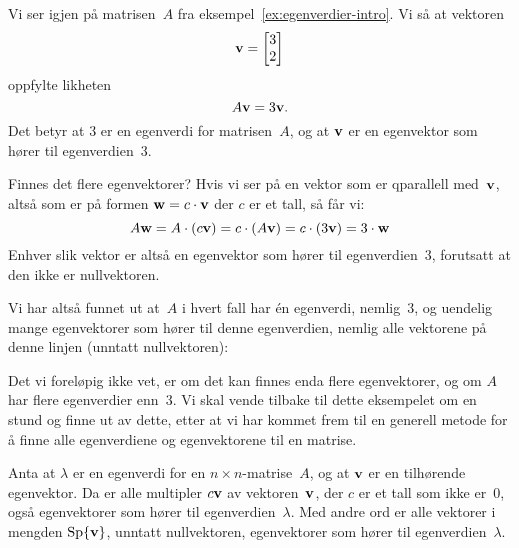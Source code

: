 \begin{ex}
Vi ser igjen på matrisen~$A$ fra eksempel~\ref{ex:egenverdier-intro}.
Vi så at vektoren
\[
\mathbf{v} = \begin{bmatrix} 3 \\ 2 \end{bmatrix}
\]
oppfylte likheten
\[
A \mathbf{v} = 3 \mathbf{v}.
\]
Det betyr at $3$ er en egenverdi for matrisen~$A$, og at $\mathbf{v}$ er en
egenvektor som hører til egenverdien~$3$.

Finnes det flere egenvektorer?  Hvis vi ser på en vektor som er
qparallell med~$\mathbf{v}$, altså som er på formen $\mathbf{w} = c \cdot \mathbf{v}$
der $c$ er et tall, så får vi:
\[
A \mathbf{w}
= A \cdot (c \mathbf{v})
= c \cdot (A \mathbf{v})
= c \cdot (3 \mathbf{v})
= 3 \cdot \mathbf{w}
\]
Enhver slik vektor er altså en egenvektor som hører til
egenverdien~$3$, forutsatt at den ikke er nullvektoren.

Vi har altså funnet ut at~$A$ i hvert fall har én egenverdi,
nemlig~$3$, og uendelig mange egenvektorer som hører til denne
egenverdien, nemlig alle vektorene på denne linjen (unntatt
nullvektoren):
\begin{center}
\end{center}

Det vi foreløpig ikke vet, er om det kan finnes enda flere
egenvektorer, og om $A$ har flere egenverdier enn~$3$.  Vi skal vende
tilbake til dette eksempelet om en stund og finne ut av dette, etter
at vi har kommet frem til en generell metode for å finne alle
egenverdiene og egenvektorene til en matrise.
\end{ex}


\begin{thm}
\label{thm:egenvektor-sp}
Anta at $\lambda$ er en egenverdi for en $n \times n$-matrise~$A$, og
at $\mathbf{v}$ er en tilhørende egenvektor.  Da er alle multipler
$c \mathbf{v}$ av vektoren~$\mathbf{v}$, der $c$ er et tall som ikke er~$0$,
også egenvektorer som hører til egenverdien~$\lambda$.  Med andre ord
er alle vektorer i mengden $\operatorname{Sp} \{\mathbf{v}\}$, unntatt nullvektoren,
egenvektorer som hører til egenverdien~$\lambda$.
\end{thm}


